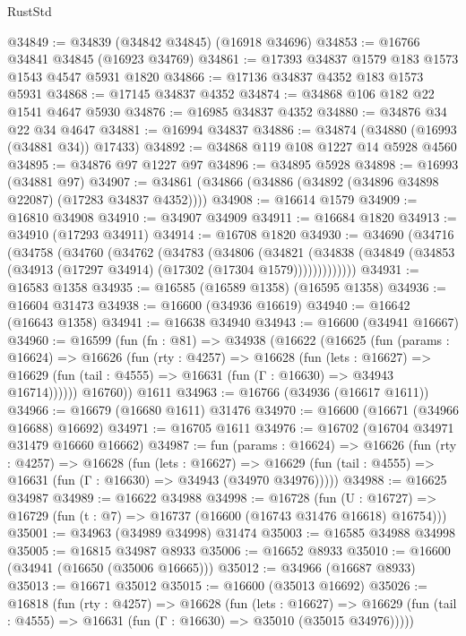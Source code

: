 \begin{lexlean}{RustStd}
\begin{coremodule}
{\begin{coremodule}
{{{{{{{{{{{{{{{{{{{{{{{{{{{{{{{{{{{{{{{{{{{{{{{{{{{{{{{@34849 := @34839 (@34842 @34845) (@16918 @34696)
@34853 := @16766 @34841 @34845 (@16923 @34769)
@34861 := @17393 @34837 @1579 @183 @1573 @1543 @4547 @5931 @1820
@34866 := @17136 @34837 @4352 @183 @1573 @5931
@34868 := @17145 @34837 @4352
@34874 := @34868 @106 @182 @22 @1541 @4647 @5930
@34876 := @16985 @34837 @4352
@34880 := @34876 @34 @22 @34 @4647
@34881 := @16994 @34837
@34886 := @34874 (@34880 (@16993 (@34881 @34)) @17433)
@34892 := @34868 @119 @108 @1227 @14 @5928 @4560
@34895 := @34876 @97 @1227 @97
@34896 := @34895 @5928
@34898 := @16993 (@34881 @97)
@34907 := @34861 (@34866 (@34886 (@34892 (@34896 @34898 @22087) (@17283 @34837 @4352))))
@34908 := @16614 @1579
@34909 := @16810 @34908
@34910 := @34907 @34909
@34911 := @16684 @1820
@34913 := @34910 (@17293 @34911)
@34914 := @16708 @1820
@34930 := @34690
    (@34716
      (@34758
        (@34760
          (@34762
            (@34783
              (@34806
                (@34821
                  (@34838 (@34849 (@34853 (@34913 (@17297 @34914) (@17302 (@17304 @1579)))))))))))))
@34931 := @16583 @1358
@34935 := @16585 (@16589 @1358) (@16595 @1358)
@34936 := @16604 @31473
@34938 := @16600 (@34936 @16619)
@34940 := @16642 (@16643 @1358)
@34941 := @16638 @34940
@34943 := @16600 (@34941 @16667)
@34960 := @16599
    (fun (fn : @81) =>
    @34938
      (@16622
        (@16625
          (fun (params : @16624) =>
          @16626
            (fun (rty : @4257) =>
            @16628
              (fun (lets : @16627) =>
              @16629 (fun (tail : @4555) => @16631 (fun (Γ : @16630) => @34943 @16714))))))
        @16760))
    @1611
@34963 := @16766 (@34936 (@16617 @1611))
@34966 := @16679 (@16680 @1611) @31476
@34970 := @16600 (@16671 (@34966 @16688) @16692)
@34971 := @16705 @1611
@34976 := @16702 (@16704 @34971 @31479 @16660 @16662)
@34987 := fun (params : @16624) =>
  @16626
    (fun (rty : @4257) =>
    @16628
      (fun (lets : @16627) =>
      @16629 (fun (tail : @4555) => @16631 (fun (Γ : @16630) => @34943 (@34970 @34976)))))
@34988 := @16625 @34987
@34989 := @16622 @34988
@34998 := @16728
    (fun (U : @16727) => @16729 (fun (t : @7) => @16737 (@16600 (@16743 @31476 @16618) @16754)))
@35001 := @34963 (@34989 @34998) @31474
@35003 := @16585 @34988 @34998
@35005 := @16815 @34987 @8933
@35006 := @16652 @8933
@35010 := @16600 (@34941 (@16650 (@35006 @16665)))
@35012 := @34966 (@16687 @8933)
@35013 := @16671 @35012
@35015 := @16600 (@35013 @16692)
@35026 := @16818
    (fun (rty : @4257) =>
    @16628
      (fun (lets : @16627) =>
      @16629 (fun (tail : @4555) => @16631 (fun (Γ : @16630) => @35010 (@35015 @34976)))))
}}}}}}}}}}}}}}}}}}}}}}}}}}}}}}}}}}}}}}}}}}}}}}}}}}}}}}}
\end{coremodule}}
\end{coremodule}
\end{lexlean}

